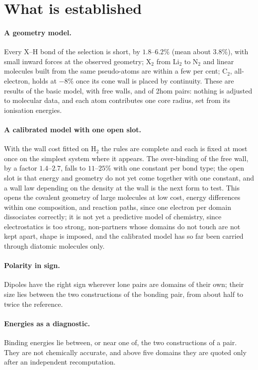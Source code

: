 \section{What is established}\label{sec:hydride-summary-text}

\paragraph{A geometry model.} Every X--H bond of the selection is short, by $1.8$--$6.2\%$ (mean about $3.8\%$),
with small inward forces at the observed geometry; X$_2$ from Li$_2$ to N$_2$ and linear molecules built from the
same pseudo-atoms are within a few per cent; C$_2$, all-electron, holds at $-8\%$ once its cone wall is placed
by continuity. These are results of the basic model, with free walls, and of 2hom pairs: nothing is adjusted to
molecular data, and each atom contributes one core radius, set from its ionisation energies.

\paragraph{A calibrated model with one open slot.} With the wall cost fitted on H$_2$ the rules are complete
and each is fixed at most once on the simplest system where it appears. The over-binding of the free wall, by a
factor $1.4$--$2.7$, falls to $11$--$25\%$ with one constant per bond type; the open slot is that energy and
geometry do not yet come together with one constant, and a wall law depending on the density at the wall is the
next form to test. This opens the covalent geometry of large molecules at low cost, energy differences within
one composition, and reaction paths, since one electron per domain dissociates correctly; it is not yet a
predictive model of chemistry, since electrostatics is too strong, non-partners whose domains do not touch are
not kept apart, shape is imposed, and the calibrated model has so far been carried through diatomic molecules
only.

\paragraph{Polarity in sign.} Dipoles have the right sign wherever lone pairs are domains of their own; their
size lies between the two constructions of the bonding pair, from about half to twice the reference.

\paragraph{Energies as a diagnostic.} Binding energies lie between, or near one of, the two constructions of a
pair. They are not chemically accurate, and above five domains they are quoted only after an independent
recomputation.

